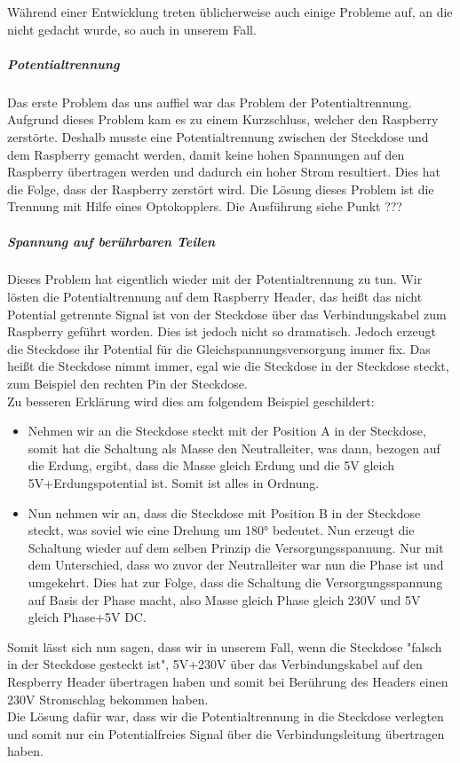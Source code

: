 Während einer Entwicklung treten üblicherweise auch einige Probleme auf, an die nicht gedacht wurde, so auch in unserem Fall.\\
\subparagraph{Potentialtrennung}\label{sec:report_hardware_pot}
Das erste Problem das uns auffiel war das Problem der Potentialtrennung. Aufgrund dieses Problem kam es zu einem Kurzschluss, welcher den Raspberry zerstörte. Deshalb musste eine Potentialtrennung zwischen der Steckdose und dem Raspberry gemacht werden, damit keine hohen Spannungen auf den Raspberry übertragen werden und dadurch ein hoher Strom resultiert. Dies hat die Folge, dass der Raspberry zerstört wird. Die Lösung dieses Problem ist die Trennung mit Hilfe eines Optokopplers. Die Ausführung siehe Punkt ??? \\
\subparagraph{Spannung auf berührbaren Teilen}\label{sec:report_hardware_spannung}
Dieses Problem hat eigentlich wieder mit der Potentialtrennung zu tun. Wir lösten die Potentialtrennung auf dem Raspberry Header, das heißt das nicht Potential getrennte Signal ist von der Steckdose über das Verbindungskabel zum Raspberry geführt worden. Dies ist jedoch nicht so dramatisch. Jedoch erzeugt die Steckdose ihr Potential für die Gleichspannungsversorgung immer fix. Das heißt die Steckdose nimmt immer, egal wie die Steckdose in der Steckdose steckt, zum Beispiel den rechten Pin der Steckdose.\\
Zu besseren Erklärung wird dies am folgendem Beispiel geschildert:\\
\begin{itemize}
	\item Nehmen wir an die Steckdose steckt mit der Position A in der Steckdose, somit hat die Schaltung als Masse den Neutralleiter, was dann, bezogen auf die Erdung, ergibt, dass die Masse gleich Erdung und die  5V gleich 5V+Erdungspotential ist. Somit ist alles in Ordnung.
	\item Nun nehmen wir an, dass die Steckdose mit Position B in der Steckdose steckt, was soviel wie eine Drehung um 180° bedeutet. Nun erzeugt die Schaltung wieder auf dem selben Prinzip die Versorgungsspannung. Nur mit dem Unterschied, dass wo zuvor der Neutralleiter war nun die Phase ist und umgekehrt. Dies hat zur Folge, dass die Schaltung die Versorgungsspannung auf Basis der Phase macht, also Masse gleich Phase gleich 230V und 5V gleich Phase+5V DC.
\end{itemize}
Somit lässt sich nun sagen, dass wir in unserem Fall, wenn die Steckdose "falsch in der Steckdose gesteckt ist", 5V+230V über das Verbindungskabel auf den Respberry Header übertragen haben und somit bei Berührung des Headers einen 230V Stromschlag bekommen haben.\\
Die Lösung dafür war, dass wir die Potentialtrennung in die Steckdose verlegten und somit nur ein Potentialfreies Signal über die Verbindungsleitung übertragen haben.